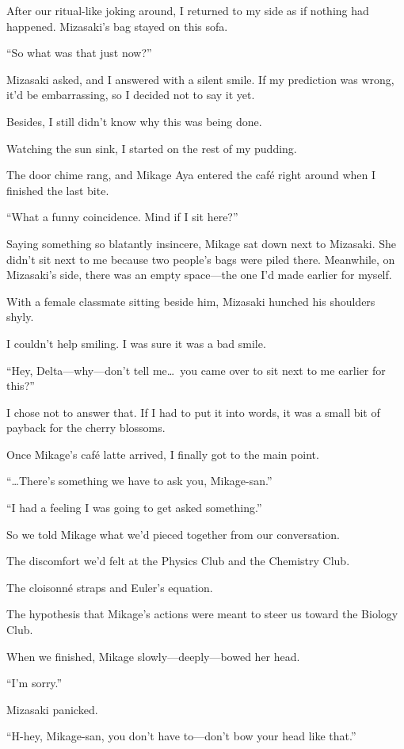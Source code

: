 \documentclass[
    a4paper,
    12pt,
    twoside,
    openany,
    UTF8,
    fontset=windows
]{ctexbook}
\begin{document}
After our ritual-like joking around, I returned to my side as if nothing had happened. Mizasaki's bag stayed on this sofa.

``So what was that just now?''

Mizasaki asked, and I answered with a silent smile. If my prediction was wrong, it'd be embarrassing, so I decided not to say it yet.

Besides, I still didn't know why this was being done.

Watching the sun sink, I started on the rest of my pudding.

The door chime rang, and Mikage Aya entered the café right around when I finished the last bite.

``What a funny coincidence. Mind if I sit here?''

Saying something so blatantly insincere, Mikage sat down next to Mizasaki. She didn't sit next to me because two people's bags were piled there. Meanwhile, on Mizasaki's side, there was an empty space---the one I'd made earlier for myself.

With a female classmate sitting beside him, Mizasaki hunched his shoulders shyly.

I couldn't help smiling. I was sure it was a bad smile.

``Hey, Delta---why---don't tell me\dots\ you came over to sit next to me earlier for this?''

I chose not to answer that. If I had to put it into words, it was a small bit of payback for the cherry blossoms.

Once Mikage's café latte arrived, I finally got to the main point.

``\dots There's something we have to ask you, Mikage-san.''

``I had a feeling I was going to get asked something.''

So we told Mikage what we'd pieced together from our conversation.

The discomfort we'd felt at the Physics Club and the Chemistry Club.

The cloisonné straps and Euler's equation.

The hypothesis that Mikage's actions were meant to steer us toward the Biology Club.

When we finished, Mikage slowly---deeply---bowed her head.

``I'm sorry.''

Mizasaki panicked.

``H-hey, Mikage-san, you don't have to---don't bow your head like that.''
\end{document}
